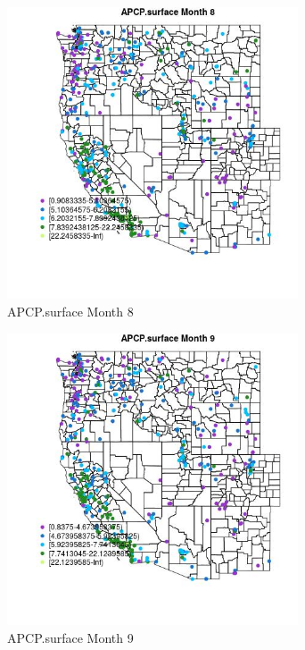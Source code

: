 \begin{figure} 
\centering  
\includegraphics[width=0.77\textwidth]{Code_Outputs/ML_input_report_ML_input_PM25_Step5_part_d_de_duplicated_aves_ML_input_MapObsMo8APCPsurface.jpg} 
\caption{\label{fig:ML_input_report_ML_input_PM25_Step5_part_d_de_duplicated_aves_ML_inputMapObsMo8APCPsurface}APCP.surface Month 8} 
\end{figure} 
 

\begin{figure} 
\centering  
\includegraphics[width=0.77\textwidth]{Code_Outputs/ML_input_report_ML_input_PM25_Step5_part_d_de_duplicated_aves_ML_input_MapObsMo9APCPsurface.jpg} 
\caption{\label{fig:ML_input_report_ML_input_PM25_Step5_part_d_de_duplicated_aves_ML_inputMapObsMo9APCPsurface}APCP.surface Month 9} 
\end{figure} 
 

